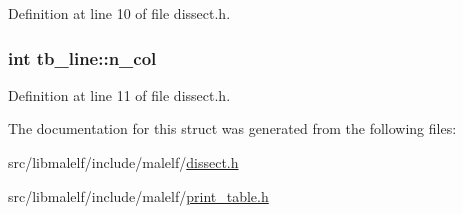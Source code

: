 Definition at line 10 of file dissect.h.

\hypertarget{structtb__line_adc05d4116a10f0cd23f22f9be0f7495e}{
\subsubsection[{n\_\-col}]{\setlength{\rightskip}{0pt plus 5cm}int {\bf tb\_\-line::n\_\-col}}}
\label{structtb__line_adc05d4116a10f0cd23f22f9be0f7495e}


Definition at line 11 of file dissect.h.



The documentation for this struct was generated from the following files:\begin{DoxyCompactItemize}
\item 
src/libmalelf/include/malelf/\hyperlink{dissect_8h}{dissect.h}\item 
src/libmalelf/include/malelf/\hyperlink{print__table_8h}{print\_\-table.h}\end{DoxyCompactItemize}
